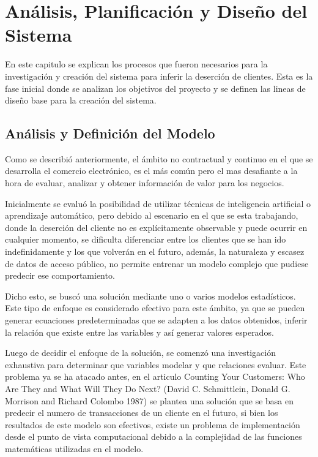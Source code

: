 
\chapter{Análisis, Planificación y Diseño del Sistema}

En este capitulo se explican los procesos que fueron necesarios para la investigación y creación del sistema para inferir la deserción de clientes. Esta es la fase inicial donde se analizan los objetivos del proyecto y se definen las lineas de diseño base para la creación del sistema.

\section{Análisis y Definición del Modelo}

Como se describió anteriormente, el ámbito no contractual y continuo en el que se desarrolla el comercio electrónico, es el más común pero el mas desafiante a la hora de evaluar, analizar y obtener información de valor para los negocios. 

	Inicialmente se evaluó la posibilidad de utilizar técnicas de inteligencia artificial o aprendizaje automático, pero debido al escenario en el que se esta trabajando, donde la deserción del cliente no es explícitamente observable y puede ocurrir en cualquier momento, se dificulta diferenciar entre los clientes que se han ido indefinidamente y los que volverán en el futuro, además, la naturaleza y escasez de datos de acceso público, no permite entrenar un modelo complejo que pudiese predecir ese comportamiento.

	Dicho esto, se buscó una solución mediante uno o varios modelos estadísticos. Este tipo de enfoque es considerado efectivo para este ámbito, ya que se pueden generar ecuaciones predeterminadas que se adapten a los datos obtenidos, inferir la relación que existe entre las variables y así generar valores esperados.

	Luego de decidir el enfoque de la solución, se comenzó una investigación exhaustiva para determinar que variables modelar y que relaciones evaluar. Este problema ya se ha atacado antes, en el articulo Counting Your Customers: Who Are They and What Will They Do Next? (David C. Schmittlein, Donald G. Morrison and Richard Colombo 1987) se plantea una solución que se basa en predecir el numero de transacciones de un cliente en el futuro, si bien los resultados de este modelo son efectivos, existe un problema de implementación desde el punto de vista computacional debido a la complejidad de las funciones matemáticas utilizadas en el modelo.

